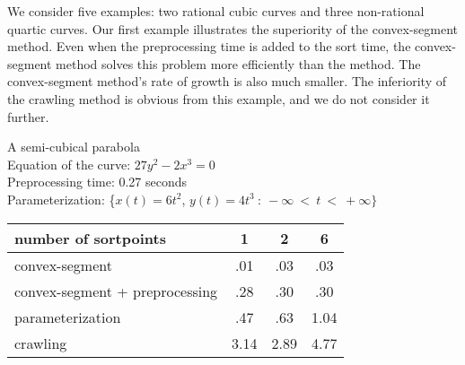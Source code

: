 We consider five examples: two rational cubic curves and three non-rational
quartic curves.
Our first example illustrates the superiority of the convex-segment method.
Even when the preprocessing time is added to the sort time, the 
convex-segment method solves this problem more efficiently 
than the \param method.
The convex-segment method's rate of growth is also much smaller.
The inferiority of the crawling method is obvious from this example, and we do
not consider it further.
%
\begin{example}
A semi-cubical parabola\\
Equation of the curve: $27 y^{2} - 2x^{3} = 0$\\
Preprocessing time: 0.27 seconds\\
Parameterization: \{$x(t) = 6t^{2}$,\vspace{.5in} $y(t) = 4t^{3}\ :\ 
-\infty\ <\ t\ <\ +\infty \}$\\
%
\begin{tabular}{|l|c|c|c|}  \hline
number of sortpoints & 1 & 2 & 6 \\ \hline \hline
convex-segment &           .01 & .03 & .03 \\ \hline
convex-segment + preprocessing & .28 & .30 & .30 \\ \hline
parameterization & .47 & .63 & 1.04 \\ \hline
crawling         & 3.14 & 2.89 & 4.77 \\ \hline
\end{tabular}
\end{example}


